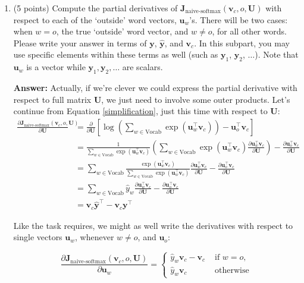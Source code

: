\documentclass{article}
\newenvironment{answer}{
    {\bf Answer:} \sf \begingroup\color{red}
}{\endgroup}%
\begin{document}
\begin{enumerate}[label=(\alph*)]
\begin{shaded}
\begin{answer}
\end{answer}
\end{shaded}

\item (5 points) Compute the partial derivatives of $\bm J_{\text{naive-softmax}}(\bm v_c, o, \bm U)$ with respect to each of the `outside' word vectors, $\bm u_w$'s. There will be two cases: when $w=o$, the true `outside' word vector, and $w \neq o$, for all other words. Please write your answer in terms of $\bm y$, $\hat{\bm y}$, and $\bm v_c$. In this subpart, you may use specific elements within these terms as well (such as $\bm y_1$, $\bm y_2$, $\dots$). Note that $\bm u_w$ is a vector while $\bm y_1, \bm y_2, \dots$ are scalars.

\begin{shaded}
\begin{answer} Actually, if we're clever we could express the partial derivative with respect to full matrix $\bm U$, we just need to involve some outer products. Let's continue from Equation \ref{simplification}, just this time with respect to $\bm U$:
\begin{align}
\frac{\partial \bm J_{\text{naive-softmax}}(\bm v_c, o, \bm U)}{\partial \bm U} &= \frac{\partial}{\partial \bm U} \left[\log\left(\sum_{w \in \text{Vocab}} \exp(\bm u_{w}^\top \bm v_c)\right)-\bm u_{o}^\top \bm v_c\right] \\
&= \frac{1}{\sum_{w \in \text{Vocab}} \exp(\bm u_{w}^\top \bm v_c)}\left(\sum_{w \in \text{Vocab}} \exp(\bm u_{w}^\top \bm v_c) \frac{\partial \bm u_w^{\top}\bm v_c}{\partial \bm U} \right) - \frac{\partial \bm u_o^{\top}\bm v_c}{\partial \bm U} \\
&= \sum_{w \in \text{Vocab}} \frac{\exp(\bm u_{w}^\top \bm v_c)}{\sum_{w \in \text{Vocab}} \exp(\bm u_{w}^\top \bm v_c)}\frac{\partial \bm u_w^{\top}\bm v_c}{\partial \bm U} - \frac{\partial \bm u_o^{\top}\bm v_c}{\partial \bm U} \\
&= \sum_{w \in \text{Vocab}} \hat y_w\frac{\partial \bm u_w^{\top}\bm v_c}{\partial \bm U} - \frac{\partial \bm u_o^{\top}\bm v_c}{\partial \bm U} \\
&=\label{wrtU} \bm v_c \hat{\bm y}^{\top} - \bm v_c \bm y^{\top}
\end{align}

Like the task requires, we might as well write the derivatives with respect to single vectors $\bm u_w$, whenever $w\ne o$, and $\bm u_o$:

\begin{equation}
    \frac{\partial \bm J_{\text{naive-softmax}}(\bm v_c, o, \bm U)}{\partial \bm u_w} = \begin{cases}
        \hat{y}_w \bm v_c - \bm v_c  & \text{ if } w = o,\\
        \hat{y}_w \bm v_c & \text{ otherwise}
    \end{cases}
\end{equation}


\end{answer}
\end{shaded}
\end{enumerate}
\end{document}
